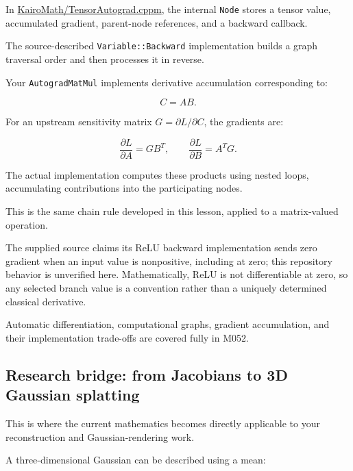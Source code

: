 \hypertarget{02-foundations-ii-ch021-kairomaths-automatic-differentiation-representation}{}

In \href{https://github.com/swayam8624/KairoMath/blob/master/TensorAutograd.cppm?utm_source=chatgpt.com}{KairoMath/TensorAutograd.cppm}, the internal \texttt{Node} stores a tensor value, accumulated gradient, parent-node references, and a backward callback.

The source-described \texttt{Variable::Backward} implementation builds a graph traversal order and then processes it in reverse.

Your \texttt{AutogradMatMul} implements derivative accumulation corresponding to:

\[
C=AB.
\]

For an upstream sensitivity matrix \(G=\partial L/\partial C\), the gradients are:

\[
\boxed{ \frac{\partial L}{\partial A}=GB^T, \qquad \frac{\partial L}{\partial B}=A^TG }.
\]

The actual implementation computes these products using nested loops, accumulating contributions into the participating nodes.

This is the same chain rule developed in this lesson, applied to a matrix-valued operation.

The supplied source claims its ReLU backward implementation sends zero gradient when an input value is nonpositive, including at zero; this repository behavior is unverified here. Mathematically, ReLU is not differentiable at zero, so any selected branch value is a convention rather than a uniquely determined classical derivative.

Automatic differentiation, computational graphs, gradient accumulation, and their implementation trade-offs are covered fully in M052.

\subsection{Research bridge: from Jacobians to 3D Gaussian splatting}\label{02-foundations-ii-ch021-research-bridge-from-jacobians-to-3d-gaussian-splatting}

\hypertarget{02-foundations-ii-ch021-research-bridge-from-jacobians-to-3d-gaussian-splatting}{}

This is where the current mathematics becomes directly applicable to your reconstruction and Gaussian-rendering work.

A three-dimensional Gaussian can be described using a mean:

